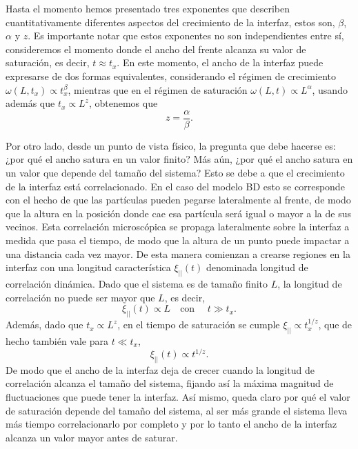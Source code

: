Hasta el momento hemos presentado tres exponentes que describen cuantitativamente diferentes aspectos del crecimiento de la interfaz, estos son, 
$\beta$, $\alpha$ y $z$. Es importante notar que estos exponentes no son independientes entre sí, consideremos el momento donde el ancho del frente
alcanza su valor de saturación, es decir, $t \approx t_x$. En este momento, el ancho de la interfaz puede expresarse de dos formas equivalentes, 
considerando el régimen de crecimiento $\omega(L,t_x) \propto t_x^\beta$, mientras que en el régimen de saturación $\omega(L,t) \propto L^\alpha$, usando además
que $t_x \propto L^z$, obtenemos que 
\begin{equation}
    z = \frac{\alpha}{\beta}.
\end{equation}

Por otro lado, desde un punto de vista físico, la pregunta que debe hacerse es: ¿por qué el ancho satura en un valor finito? Más aún, ¿por qué el ancho satura en un valor que depende del 
tamaño del sistema? Esto se debe a que el crecimiento de la interfaz está correlacionado. En el caso del modelo BD esto se corresponde con el hecho de que 
las partículas pueden pegarse lateralmente al frente, de modo que la altura en la posición donde cae esa partícula será igual o mayor a la de sus vecinos. Esta correlación 
microscópica se propaga lateralmente sobre la interfaz a medida que pasa el tiempo, de modo que la altura de un punto puede impactar a una distancia cada vez mayor. De 
esta manera comienzan a crearse regiones en la interfaz con una longitud característica $\xi_{||}(t)$ denominada longitud de correlación dinámica. Dado que el sistema es de tamaño 
finito $L$, la longitud de correlación no puede ser mayor que $L$, es decir,
\begin{equation}
    \xi_{||}(t) \propto L \quad \text{con } \quad t \gg t_x.
\end{equation}
Además, dado que $t_x \propto L^z$, en el tiempo de saturación se cumple $\xi_{||} \propto t_x^{1/z}$, que de hecho también vale para $t \ll t_x$,
\begin{equation}
    \xi_{||}(t) \propto t^{1/z}.
\end{equation}
De modo que el ancho de la interfaz deja de crecer cuando la longitud de correlación alcanza el tamaño del sistema, fijando así la máxima magnitud de 
fluctuaciones que puede tener la interfaz. Así mismo, queda claro por qué el valor de saturación depende del tamaño del sistema, al ser más grande el sistema lleva
más tiempo correlacionarlo por completo y por lo tanto el ancho de la interfaz alcanza un valor mayor antes de saturar.

